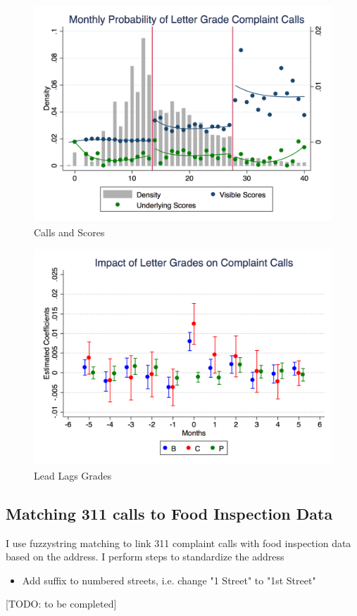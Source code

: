 \documentclass[11pt]{article}
\begin{document}
\begin{figure}[h!]
\centering
\includegraphics[scale = 0.6]{Figures/Calls/score_calls_hist_vis.png}
\caption{Calls and Scores}
\label{calls_score}
\end{figure}

\begin{figure}[h!]
\centering
\includegraphics[scale = 0.6]{Figures/Calls/lead_lag_calls_letter.png}
\caption{Lead Lags Grades}
\label{lead_lag_grade}
\end{figure}

\subsection{Matching 311 calls to Food Inspection Data}
I use fuzzystring matching to link 311 complaint calls with food inspection data based on the address. I perform steps to standardize the address
\begin{itemize}
\item Add suffix to numbered streets, i.e. change "1 Street" to "1st Street"
\end{itemize}
[TODO: to be completed]
\end{document}
